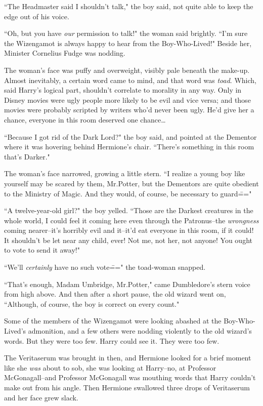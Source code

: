 ``The Headmaster said I shouldn't talk," the boy said, not quite able to keep the edge out of his voice.

``Oh, but you have \emph{our} permission to talk!" the woman said brightly. ``I'm sure the Wizengamot is always happy to hear from the Boy-Who-Lived!" Beside her, Minister Cornelius Fudge was nodding.

The woman's face was puffy and overweight, visibly pale beneath the make-up. Almost inevitably, a certain word came to mind, and that word was \emph{toad}. Which, said Harry's logical part, shouldn't correlate to morality in any way. Only in Disney movies were ugly people more likely to be evil and vice versa; and those movies were probably scripted by writers who'd never been ugly. He'd give her a chance, everyone in this room deserved one chance{\ldots}

``Because I got rid of the Dark Lord?" the boy said, and pointed at the Dementor where it was hovering behind Hermione's chair. ``There's something in this room that's Darker."

The woman's face narrowed, growing a little stern. ``I realize a young boy like yourself may be scared by them, Mr.\?Potter, but the Dementors are quite obedient to the Ministry of Magic. And they would, of course, be necessary to guard\==="

``A twelve-year-old girl?" the boy yelled. ``Those are the Darkest creatures in the whole world, I could feel it coming here even through the Patronus\---the \emph{wrongness} coming nearer\---it's horribly evil and it\---it'd eat everyone in this room, if it could! It shouldn't be let near any child, ever! Not me, not her, not anyone! You ought to vote to send it away!"

``We'll \emph{certainly} have no such vote\===" the toad-woman snapped.

``That's enough, Madam Umbridge, Mr.\?Potter," came Dumbledore's stern voice from high above. And then after a short pause, the old wizard went on, ``Although, of course, the boy is correct on every count."

Some of the members of the Wizengamot were looking abashed at the Boy-Who-Lived's admonition, and a few others were nodding violently to the old wizard's words. But they were too few. Harry could see it. They were too few.

The Veritaserum was brought in then, and Hermione looked for a brief moment like she \emph{was} about to sob, she was looking at Harry\---no, at Professor McGonagall\---and Professor McGonagall was mouthing words that Harry couldn't make out from his angle. Then Hermione swallowed three drops of Veritaserum and her face grew slack.

